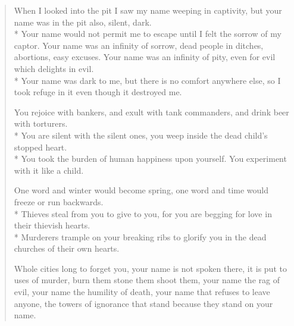 \documentclass[english,11pt,letterpaper,onecolumn]{scrbook}
\begin{document}
\begin{verse}

When I looked into the pit I saw my name weeping in captivity, but your name was in the pit also, silent, dark. \\*
Your name would not permit me to escape until I felt the sorrow of my captor.  Your name was an infinity of sorrow, dead people in ditches, abortions, easy excuses.  Your name was an infinity of pity, even for evil which delights in evil. \\*
Your name was dark to me, but there is no comfort anywhere else, so I took refuge in it even though it destroyed me.



You rejoice with bankers, and exult with tank commanders, and drink beer with torturers. \\*
You are silent with the silent ones, you weep inside the dead child's stopped heart. \\*
You took the burden of human happiness upon yourself.  You experiment with it like a child.



One word and winter would become spring, one word and time would freeze or run backwards. \\*
Thieves steal from you to give to you, for you are begging for love in their thievish hearts. \\*
Murderers trample on your breaking ribs to glorify you in the dead churches of their own hearts.



Whole cities long to forget you, your name is not spoken there, it is put to uses of murder, burn them stone them shoot them, your name the rag of evil, your name the humility of death, your name that refuses to leave anyone, the towers of ignorance that stand because they stand on your name.

\end{verse}

\newpage
{}
\end{document}
